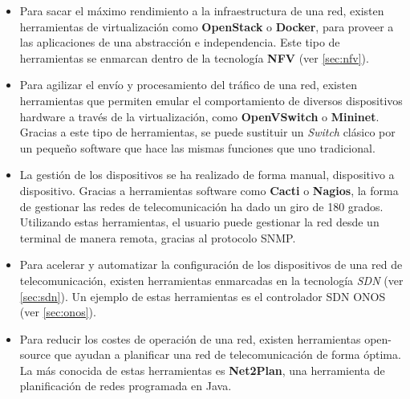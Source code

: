 \begin{itemize}
	\item Para sacar el máximo rendimiento a la infraestructura de una red, existen herramientas de virtualización como \textbf{OpenStack}\cite{openstackbib} o \textbf{Docker}\cite{dockerbib}, para proveer a las aplicaciones de una abstracción e independencia. Este tipo de herramientas se enmarcan dentro de la tecnología \textbf{\ac{NFV}} (ver \ref{sec:nfv}).
	
	\item Para agilizar el envío y procesamiento del tráfico de una red, existen herramientas que permiten emular el comportamiento de diversos dispositivos hardware a través de la virtualización, como \textbf{OpenVSwitch}\cite{openvswitchbib} o \textbf{Mininet}\cite{mininetbib}. Gracias a este tipo de herramientas, se puede sustituir un \textit{Switch} clásico por un pequeño software que hace las mismas funciones que uno tradicional.
	
	\item La gestión de los dispositivos se ha realizado de forma manual, dispositivo a dispositivo. Gracias a herramientas software como \textbf{Cacti}\cite{cactibib} o \textbf{Nagios}\cite{nagiosbib}, la forma de gestionar las redes de telecomunicación ha dado un giro de 180 grados. Utilizando estas herramientas, el usuario puede gestionar la red desde un terminal de manera remota, gracias al protocolo \ac{SNMP}.
	
	\item Para acelerar y automatizar la configuración de los dispositivos de una red de telecomunicación, existen herramientas enmarcadas en la tecnología \textit{\ac{SDN}} (ver \ref{sec:sdn}). Un ejemplo de estas herramientas es el controlador \ac{SDN} \ac{ONOS} (ver \ref{sec:onos}).
	
	\item Para reducir los costes de operación de una red, existen herramientas open-source que ayudan a planificar una red de telecomunicación de forma óptima. La más conocida de estas herramientas es \textbf{Net2Plan}\cite{net2planbib}, una herramienta de planificación de redes programada en Java.
\end{itemize}



\cleardoublepage